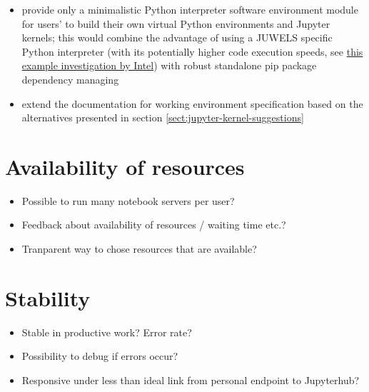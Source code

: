 \documentclass[11pt,a4paper]{article}
\begin{document}
\begin{itemize}
  \item provide only a minimalistic Python interpreter software environment module for users' to build their own virtual Python environments and Jupyter kernels;
  this would combine the advantage of using a JUWELS specific Python interpreter (with its potentially higher code execution speeds, see \href{https://www.fz-juelich.de/SharedDocs/Downloads/IAS/JSC/EN/slides/supercomputer-ressources-2019-11/15a-tuning_intel.html}{this example investigation by Intel}) with robust standalone pip package dependency managing

  \item extend the documentation for working environment specification based on the alternatives presented in section \ref{sect:jupyter-kernel-suggestions}

\end{itemize}


\section{Availability of resources}
\label{s-availability-resources}

\begin{itemize}
  \item Possible to run many notebook servers per user?
  \item Feedback about availability of resources / waiting time etc.?
  \item Tranparent way to chose resources that are available?
\end{itemize}


\section{Stability}
\label{s-stability}

\begin{itemize}
	\item Stable in productive work? Error rate?
  \item Possibility to debug if errors occur?
  \item Responsive under less than ideal link from personal endpoint to Jupyterhub?
\end{itemize}

\end{document}
